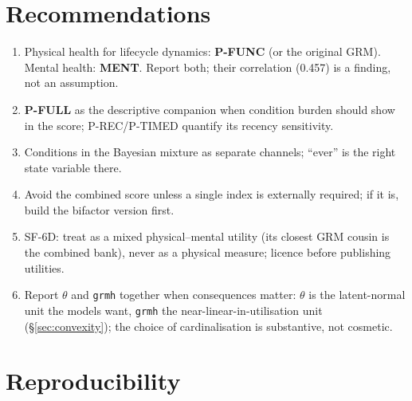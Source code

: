 \documentclass[11pt]{article}
\newcommand{\code}[1]{\texttt{\small #1}}
\begin{document}
\section{Recommendations}

\begin{enumerate}\itemsep2pt
\item Physical health for lifecycle dynamics: \textbf{P-FUNC} (or the
original GRM). Mental health: \textbf{MENT}. Report both; their correlation
(0.457) is a finding, not an assumption.
\item \textbf{P-FULL} as the descriptive companion when condition burden
should show in the score; P-REC/P-TIMED quantify its recency sensitivity.
\item Conditions in the Bayesian mixture as separate channels; ``ever'' is
the right state variable there.
\item Avoid the combined score unless a single index is externally required;
if it is, build the bifactor version first.
\item SF-6D: treat as a mixed physical--mental utility (its closest GRM
cousin is the combined bank), never as a physical measure; licence before
publishing utilities.
\item Report $\theta$ and \code{grmh} together when consequences matter:
$\theta$ is the latent-normal unit the models want, \code{grmh} the
near-linear-in-utilisation unit (\S\ref{sec:convexity}); the choice of
cardinalisation is substantive, not cosmetic.
\end{enumerate}

\section{Reproducibility}
\end{document}
